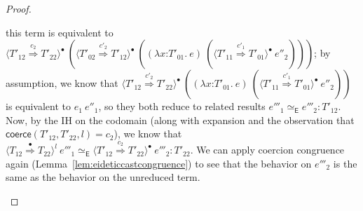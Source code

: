 \documentclass[9pt]{extarticle}
\newcommand{\ottnt}[1]{\mathit{#1}}
\newcommand{\ottsym}[1]{#1}
\begin{document}
\begin{lemma}
\begin{proof}
{\begin{itemize}
\begin{itemize}
        this term is equivalent to $ \langle  \ottnt{T'_{{\mathrm{12}}}}  \mathord{ \overset{ \ottnt{c_{{\mathrm{2}}}} }{\Rightarrow} }  \ottnt{T'_{{\mathrm{22}}}}  \rangle^{\bullet} ~   (  \langle  \ottnt{T'_{{\mathrm{02}}}}  \mathord{ \overset{ \ottnt{c'_{{\mathrm{2}}}} }{\Rightarrow} }  \ottnt{T'_{{\mathrm{12}}}}  \rangle^{\bullet} ~   (   (  \lambda \mathit{x} \mathord{:} \ottnt{T'_{{\mathrm{01}}}} .~  \ottnt{e}  )  ~  (  \langle  \ottnt{T'_{{\mathrm{11}}}}  \mathord{ \overset{ \ottnt{c'_{{\mathrm{1}}}} }{\Rightarrow} }  \ottnt{T'_{{\mathrm{01}}}}  \rangle^{\bullet} ~  \ottnt{e''_{{\mathrm{2}}}}  )   )   )  $; by
        assumption, we know that $ \langle  \ottnt{T'_{{\mathrm{12}}}}  \mathord{ \overset{ \ottnt{c'_{{\mathrm{2}}}} }{\Rightarrow} }  \ottnt{T'_{{\mathrm{22}}}}  \rangle^{\bullet} ~   (   (  \lambda \mathit{x} \mathord{:} \ottnt{T'_{{\mathrm{01}}}} .~  \ottnt{e}  )  ~  (  \langle  \ottnt{T'_{{\mathrm{11}}}}  \mathord{ \overset{ \ottnt{c'_{{\mathrm{1}}}} }{\Rightarrow} }  \ottnt{T'_{{\mathrm{01}}}}  \rangle^{\bullet} ~  \ottnt{e''_{{\mathrm{2}}}}  )   )  $ is equivalent to $ \ottnt{e_{{\mathrm{1}}}} ~ \ottnt{e''_{{\mathrm{1}}}} $,
        so they both reduce to related results $ \ottnt{e'''_{{\mathrm{1}}}}   \simeq _{  \mathsf{E}  }  \ottnt{e'''_{{\mathrm{2}}}}  :  \ottnt{T'_{{\mathrm{12}}}} $. Now, by the IH on the codomain (along with 
        expansion and the observation that $ \mathsf{coerce} ( \ottnt{T'_{{\mathrm{12}}}} , \ottnt{T'_{{\mathrm{22}}}} , \ottnt{l} )   \ottsym{=}  \ottnt{c_{{\mathrm{2}}}}$), we know that $  \langle  \ottnt{T_{{\mathrm{12}}}}  \mathord{ \overset{\bullet}{\Rightarrow} }  \ottnt{T_{{\mathrm{22}}}}  \rangle^{ \ottnt{l} } ~  \ottnt{e'''_{{\mathrm{1}}}}    \simeq _{  \mathsf{E}  }   \langle  \ottnt{T'_{{\mathrm{12}}}}  \mathord{ \overset{ \ottnt{c_{{\mathrm{2}}}} }{\Rightarrow} }  \ottnt{T'_{{\mathrm{22}}}}  \rangle^{\bullet} ~  \ottnt{e'''_{{\mathrm{2}}}}   :  \ottnt{T'_{{\mathrm{22}}}} $. We can apply coercion congruence again
        (Lemma~\ref{lem:eideticcastcongruence}) to see that the
        behavior on $\ottnt{e'''_{{\mathrm{2}}}}$ is the same as the behavior on the
        unreduced term.
      \end{itemize}
    \end{itemize}
    \fi}
  \end{proof}
\end{lemma}
\end{document}
